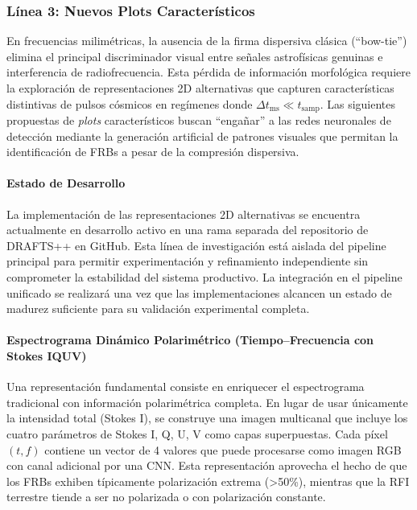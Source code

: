 \subsubsection{Línea 3: Nuevos Plots Característicos}

En frecuencias milimétricas, la ausencia de la firma dispersiva clásica (``bow-tie'') elimina el principal discriminador visual entre señales astrofísicas genuinas e interferencia de radiofrecuencia. Esta pérdida de información morfológica requiere la exploración de representaciones 2D alternativas que capturen características distintivas de pulsos cósmicos en regímenes donde $\Delta t_{\mathrm{ms}} \ll t_{\mathrm{samp}}$. Las siguientes propuestas de \textit{plots} característicos buscan ``engañar'' a las redes neuronales de detección mediante la generación artificial de patrones visuales que permitan la identificación de FRBs a pesar de la compresión dispersiva.

\paragraph{Estado de Desarrollo}

La implementación de las representaciones 2D alternativas se encuentra actualmente en desarrollo activo en una rama separada del repositorio de DRAFTS++ en GitHub. Esta línea de investigación está aislada del pipeline principal para permitir experimentación y refinamiento independiente sin comprometer la estabilidad del sistema productivo. La integración en el pipeline unificado se realizará una vez que las implementaciones alcancen un estado de madurez suficiente para su validación experimental completa.

\paragraph{Espectrograma Dinámico Polarimétrico (Tiempo–Frecuencia con Stokes IQUV)}

Una representación fundamental consiste en enriquecer el espectrograma tradicional con información polarimétrica completa. En lugar de usar únicamente la intensidad total (Stokes I), se construye una imagen multicanal que incluye los cuatro parámetros de Stokes I, Q, U, V como capas superpuestas. Cada píxel $(t,f)$ contiene un vector de 4 valores que puede procesarse como imagen RGB con canal adicional por una CNN. Esta representación aprovecha el hecho de que los FRBs exhiben típicamente polarización extrema (>50\%), mientras que la RFI terrestre tiende a ser no polarizada o con polarización constante.

